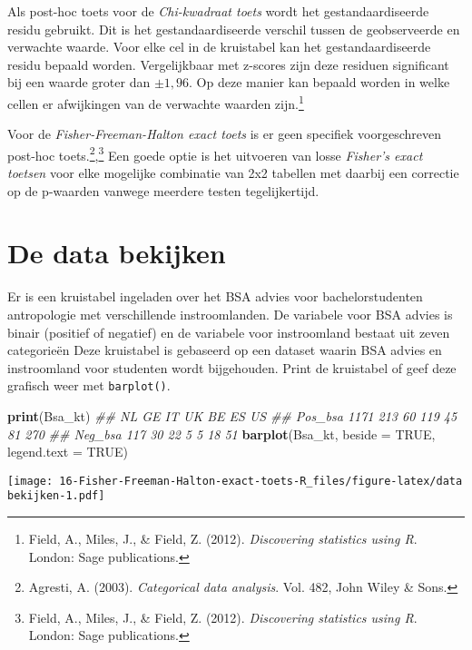 \documentclass[
]{article}
\newenvironment{Shaded}{\begin{snugshade}}{\end{snugshade}}
\newcommand{\CommentTok}[1]{\textcolor[rgb]{0.56,0.35,0.01}{\textit{#1}}}
\newcommand{\DataTypeTok}[1]{\textcolor[rgb]{0.13,0.29,0.53}{#1}}
\newcommand{\KeywordTok}[1]{\textcolor[rgb]{0.13,0.29,0.53}{\textbf{#1}}}
\newcommand{\NormalTok}[1]{#1}
\newcommand{\OtherTok}[1]{\textcolor[rgb]{0.56,0.35,0.01}{#1}}
\begin{document}
Als post-hoc toets voor de \emph{Chi-kwadraat toets} wordt het
gestandaardiseerde residu gebruikt. Dit is het gestandaardiseerde
verschil tussen de geobserveerde en verwachte waarde. Voor elke cel in
de kruistabel kan het gestandaardiseerde residu bepaald worden.
Vergelijkbaar met z-scores zijn deze residuen significant bij een waarde
groter dan \(\pm 1,96\). Op deze manier kan bepaald worden in welke
cellen er afwijkingen van de verwachte waarden zijn.\footnote{Field, A.,
  Miles, J., \& Field, Z. (2012). \emph{Discovering statistics using R}.
  London: Sage publications.}

Voor de \emph{Fisher-Freeman-Halton exact toets} is er geen specifiek
voorgeschreven post-hoc toets.\footnote{Agresti, A. (2003).
  \emph{Categorical data analysis}. Vol. 482, John Wiley \& Sons.},\footnote{Field,
  A., Miles, J., \& Field, Z. (2012). \emph{Discovering statistics using
  R}. London: Sage publications.} Een goede optie is het uitvoeren van
losse \emph{Fisher's exact toetsen} voor elke mogelijke combinatie van
2x2 tabellen met daarbij een correctie op de p-waarden vanwege meerdere
testen tegelijkertijd.

\hypertarget{de-data-bekijken}{%
\section{De data bekijken}\label{de-data-bekijken}}

Er is een kruistabel ingeladen over het BSA advies voor
bachelorstudenten antropologie met verschillende instroomlanden. De
variabele voor BSA advies is binair (positief of negatief) en de
variabele voor instroomland bestaat uit zeven categorieën Deze
kruistabel is gebaseerd op een dataset waarin BSA advies en instroomland
voor studenten wordt bijgehouden. Print de kruistabel of geef deze
grafisch weer met \texttt{barplot()}.

\begin{Shaded}
\begin{Highlighting}[]
\KeywordTok{print}\NormalTok{(Bsa_kt)}
\CommentTok{##           NL  GE IT  UK BE ES  US}
\CommentTok{## Pos_bsa 1171 213 60 119 45 81 270}
\CommentTok{## Neg_bsa  117  30 22   5  5 18  51}
\KeywordTok{barplot}\NormalTok{(Bsa_kt, }\DataTypeTok{beside =} \OtherTok{TRUE}\NormalTok{, }\DataTypeTok{legend.text =} \OtherTok{TRUE}\NormalTok{)}
\end{Highlighting}
\end{Shaded}

\texttt{[image: 16-Fisher-Freeman-Halton-exact-toets-R\_files/figure-latex/data bekijken-1.pdf]}
\end{document}
